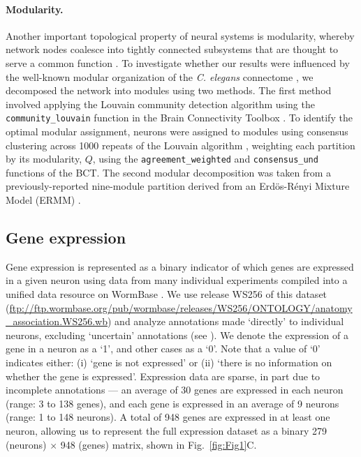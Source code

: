 \documentclass[10pt,letterpaper]{article}
\begin{document}
\paragraph{Modularity.}
Another important topological property of neural systems is modularity, whereby network nodes coalesce into tightly connected subsystems that are thought to serve a common function \cite{Sporns2016}.
To investigate whether our results were influenced by the well-known modular organization of the \emph{C. elegans} connectome \cite{Kim:2014bu, Pan:2010jt, Bassett2010, Achacoso:1992ay, Pavlovic:2014gx}, we decomposed the network into modules using two methods.
The first method involved applying the Louvain community detection algorithm \cite{Blondel:2008do} using the \texttt{community\_louvain} function in the Brain Connectivity Toolbox \cite{Rubinov:2010jd}.
To identify the optimal modular assignment, neurons were assigned to modules using consensus clustering across 1000 repeats of the Louvain algorithm \cite{Lancichinetti2012}, weighting each partition by its modularity, $Q$, using the \texttt{agreement\_weighted} and \texttt{consensus\_und} functions of the BCT\cite{Rubinov:2010jd}.
The second modular decomposition was taken from a previously-reported nine-module partition derived from an Erd\"os-R\'enyi Mixture Model (ERMM) \cite{Pavlovic:2014gx}.

\subsection*{Gene expression}
Gene expression is represented as a binary indicator of which genes are expressed in a given neuron using data from many individual experiments compiled into a unified data resource on WormBase \cite{Harris:2009kd}.
We use release WS256 of this dataset (\url{ftp://ftp.wormbase.org/pub/wormbase/releases/WS256/ONTOLOGY/anatomy_association.WS256.wb}) and analyze annotations made `directly' to individual neurons, excluding `uncertain' annotations (see ).
We denote the expression of a gene in a neuron as a `1', and other cases as a `0'.
Note that a value of `0' indicates either:
(i) `gene is not expressed' or
(ii) `there is no information on whether the gene is expressed'.
Expression data are sparse, in part due to incomplete annotations --- an average of 30 genes are expressed in each neuron (range: 3 to 138 genes), and each gene is expressed in an average of 9 neurons (range: 1 to 148 neurons).
A total of 948 genes are expressed in at least one neuron, allowing us to represent the full expression dataset as a binary 279 (neurons) $\times$ 948 (genes) matrix, shown in Fig.~\ref{fig:Fig1}C.
\end{document}
